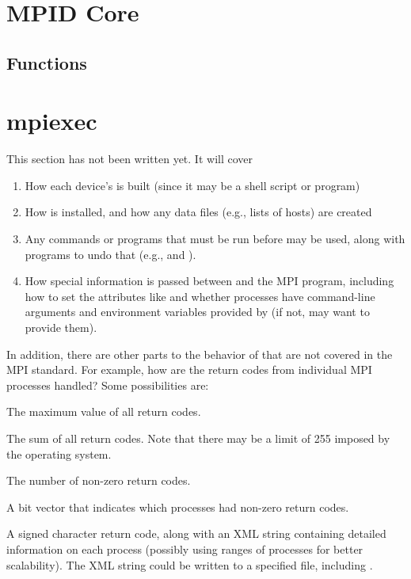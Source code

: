 \documentclass{article}
\begin{document}
\section{MPID Core}
%
\subsection{Functions}

%

\section{mpiexec}
This section has not been written yet.  It will cover
\begin{enumerate}
\item How each device's  is built (since it may be a shell
  script or program)
\item How  is installed, and how any data files (e.g., lists of
  hosts) are created
\item Any commands or programs that must be run before  may be
  used, along with programs to undo that (e.g.,  and
  ). 
\item How special information is passed between  and the MPI
  program, including how to set the attributes like  and
  whether processes have command-line arguments and environment variables
  provided by  (if not,  may want to provide
  them). 
\end{enumerate}

In addition, there are other parts to the behavior of 
that are not covered in the MPI standard.  For example, how are the
return codes from individual MPI processes handled?  Some
possibilities are:
\begin{description}
\item The maximum value of all return codes.
\item The sum of all return codes.  Note that there may be
a limit of 255 imposed by the operating system.
\item The number of non-zero return codes.
\item A bit vector that indicates which processes had non-zero return
codes.
\item A signed character return code, along with an XML string
containing detailed information on each process (possibly using ranges
of processes for better scalability).  The XML string could be written
to a specified file, including .
\end{description}
\end{document}
